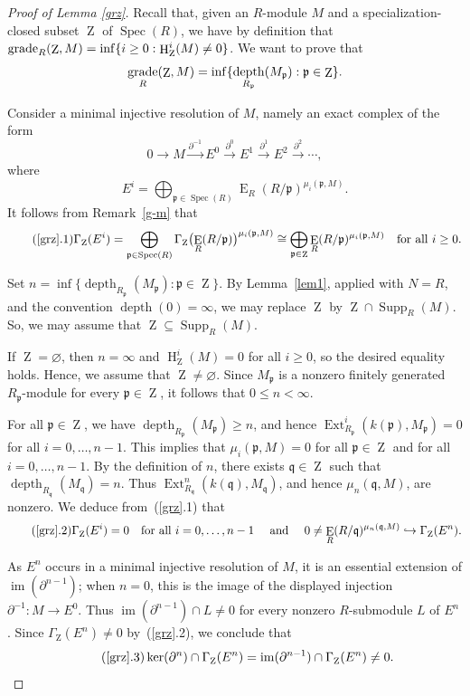 \documentclass[11pt]{amsart}
\theoremstyle{definition}
\theoremstyle{definition}
\numberwithin{equation}{section}
\newcommand{\fp}{\mathfrak{p}}
\newcommand{\fq}{\mathfrak{q}}
\DeclareMathOperator{\gr}{\textnormal{grade}}
\DeclareMathOperator{\IH}{E}
\DeclareMathOperator{\mz}{Z}
\DeclareMathOperator{\depth}{depth}
\DeclareMathOperator{\Ext}{Ext}
\DeclareMathOperator{\hh}{H}
\DeclareMathOperator{\im}{im}
\DeclareMathOperator{\Supp}{Supp}
\DeclareMathOperator{\Spec}{Spec}
\begin{document}
\begin{proof}[Proof of Lemma \ref{grz}]
Recall that, given an $R$-module $M$ and a specialization-closed subset $\mz$ of $\Spec(R)$, we have by definition that
$\gr_R(\mz,M)=\inf\{i\geq0:\hh^i_{\mz}(M)\neq0\}$. We want to prove that
\[
\gr_R(\mz,M)
=\inf\{\depth_{R_{\fp}}(M_{\fp}):\fp\in\mz\}.
\]

Consider a minimal injective resolution of $M$, namely an exact
complex of the form
\[
0\longrightarrow M
\xrightarrow{\partial^{-1}} E^0
\xrightarrow{\partial^0} E^1
\xrightarrow{\partial^1} E^2
\xrightarrow{\partial^2}\cdots,
\]
where
\[
E^i=\bigoplus_{\fp\in\Spec(R)}
\IH_R(R/\fp)^{\mu_i(\fp,M)}.
\]
It follows from Remark~\ref{g-m} that
\[
\tag{\ref{grz}.1}
\Gamma_{\mz}(E^i)
=\bigoplus_{\fp\in\Spec(R)}
\Gamma_{\mz}\bigl(\IH_R(R/\fp)\bigr)^{\mu_i(\fp,M)}
\cong
\bigoplus_{\fp\in\mz}
\IH_R(R/\fp)^{\mu_i(\fp,M)}
\quad\text{for all }i\geq0.
\]

Set $n=\inf\{\depth_{R_{\fp}}(M_{\fp}):\fp\in\mz\}$.
By Lemma~\ref{lem1}, applied with $N=R$, and the convention
$\depth(0)=\infty$, we may replace $\mz$ by
$\mz\cap\Supp_R(M)$. So, we may assume that
$\mz\subseteq\Supp_R(M)$.

If $\mz=\varnothing$, then $n=\infty$ and
$\hh^i_{\mz}(M)=0$ for all $i\geq0$, so the desired equality holds.
Hence, we assume that $\mz\neq\varnothing$.
Since $M_{\fp}$ is a nonzero finitely generated
$R_{\fp}$-module for every $\fp\in\mz$, it follows that $0\leq n<\infty$.

For all $\fp\in\mz$, we have
$\depth_{R_{\fp}}(M_{\fp})\geq n$, and hence
$\Ext^i_{R_{\fp}}(k(\fp),M_{\fp})=0$ for all $i=0, \ldots, n-1$.  
This implies that $\mu_i(\fp,M)=0$ for all $\fp\in\mz$
and for all $i=0, \ldots, n-1$. 
By the definition of $n$, there exists $\fq\in\mz$ such that
$\depth_{R_{\fq}}(M_{\fq})=n$.
Thus $\Ext^n_{R_{\fq}}(k(\fq),M_{\fq})$, and hence
$\mu_n(\fq,M)$, are nonzero.
We deduce from~(\ref{grz}.1) that
\[
\tag{\ref{grz}.2}
\Gamma_{\mz}(E^i)=0
\quad\text{for all } i=0, \ldots, n-1
\quad \text{ and } \quad 
0\neq\IH_R(R/\fq)^{\mu_n(\fq,M)}
\hookrightarrow\Gamma_{\mz}(E^n).
\]

As $E^n$ occurs in a minimal injective resolution of $M$,
it is an essential extension of
$\im(\partial^{n-1})$; when $n=0$, this is the image of
the displayed injection $\partial^{-1}:M\to E^0$.
Thus
$\im(\partial^{n-1})\cap L\neq0$
for every nonzero $R$-submodule $L$ of $E^n$.
Since $\Gamma_{\mz}(E^n)\neq0$ by~(\ref{grz}.2),
we conclude that
\[
\tag{\ref{grz}.3}
\ker(\partial^n)\cap\Gamma_{\mz}(E^n)
=\im(\partial^{n-1})\cap\Gamma_{\mz}(E^n)
\neq0.
\]


\end{proof}
\end{document}
